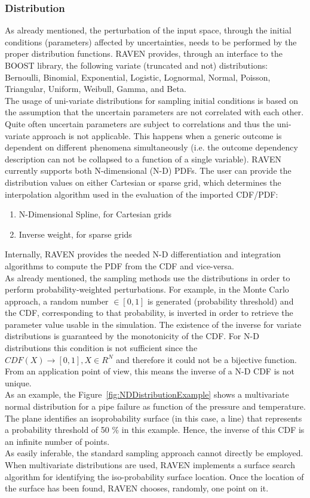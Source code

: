 \subsubsection{Distribution}
As already mentioned, the perturbation of the input space, through the initial conditions (parameters) affected by uncertainties, needs to be performed by the proper distribution functions. RAVEN provides, through an interface to the BOOST library, the following variate (truncated and not) distributions: Bernoulli, Binomial, Exponential, Logistic, Lognormal, Normal, Poisson, Triangular, Uniform, Weibull, Gamma, and Beta.
\\The usage of uni-variate distributions for sampling initial conditions is based on the assumption that the uncertain parameters are not correlated with each other. Quite often uncertain parameters are subject to correlations and thus the uni-variate approach is not applicable. This happens when a generic outcome is dependent on different phenomena simultaneously (i.e. the outcome dependency description can not be collapsed to a function of a single variable). RAVEN currently supports both N-dimensional (N-D) PDFs. The user can provide the distribution values on either Cartesian or sparse grid, which determines the interpolation algorithm used in the evaluation of the imported CDF/PDF:
\begin{enumerate}
\item N-Dimensional Spline, for Cartesian grids
\item Inverse weight, for sparse grids
\end{enumerate}
Internally, RAVEN provides the needed N-D differentiation and integration algorithms to compute the PDF from the CDF and vice-versa. 
\\As already mentioned, the sampling methods use the distributions in order to perform probability-weighted perturbations. For example, in the Monte Carlo approach, a random number $\in [0,1]$ is generated (probability threshold) and the CDF, corresponding to that probability, is inverted in order to retrieve the parameter value usable in the simulation. The existence of the inverse for variate distributions is guaranteed by the monotonicity of the CDF. For N-D distributions this condition is not sufficient since the $CDF(X)\longrightarrow [0,1],X \in  R^{N} $ and therefore it could not be a bijective function. From an application point of view, this means the inverse of a N-D CDF is not unique. 
\\As an example, the Figure~\ref{fig:NDDistributionExample} shows a multivariate normal distribution for a pipe failure as function of the pressure and temperature. The plane identifies an isoprobability surface (in this case, a line) that represents a probability threshold of 50 \% in this example.  Hence, the inverse of this CDF is an infinite number of points.
 \\As easily inferable, the standard sampling approach cannot directly be employed. When multivariate distributions are used, RAVEN implements a surface search algorithm for identifying the iso-probability surface location. Once the location of the surface has been found, RAVEN chooses, randomly, one point on it.

